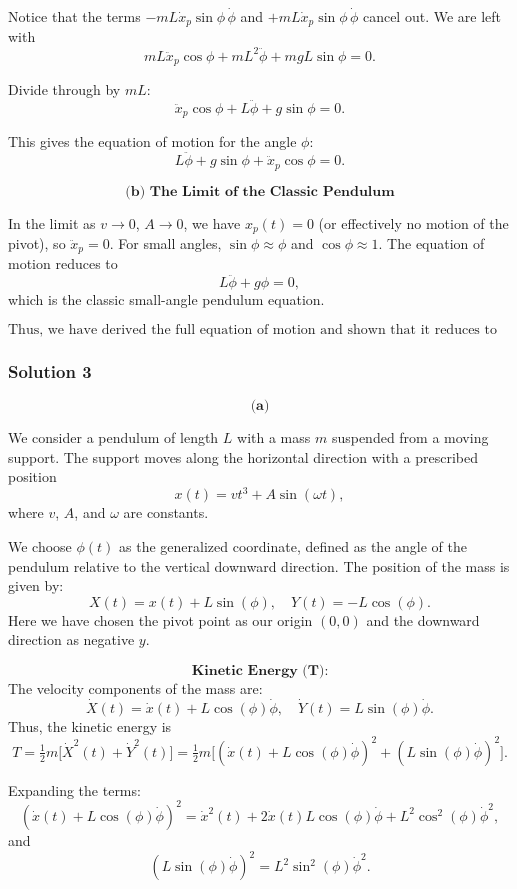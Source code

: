 \documentclass{article}
\begin{document}
Notice that the terms $-mL\dot{x}_p\sin\phi\,\dot{\phi}$ and $+mL\dot{x}_p\sin\phi\,\dot{\phi}$ cancel out. We are left with
\[
mL\ddot{x}_p\cos\phi + mL^2\ddot{\phi} + mgL\sin\phi = 0.
\]

Divide through by $mL$:
\[
\ddot{x}_p\cos\phi + L\ddot{\phi} + g\sin\phi = 0.
\]

This gives the equation of motion for the angle $\phi$:
\[
L\ddot{\phi} + g\sin\phi + \ddot{x}_p\cos\phi = 0.
\]

\[
\textbf{(b) The Limit of the Classic Pendulum}
\]

In the limit as $v \to 0$, $A \to 0$, we have $x_p(t)=0$ (or effectively no motion of the pivot), so $\ddot{x}_p = 0$. For small angles, $\sin\phi \approx \phi$ and $\cos\phi \approx 1$. The equation of motion reduces to
\[
L\ddot{\phi} + g\phi = 0,
\]
which is the classic small-angle pendulum equation.

\[
\boxed{ \text{Thus, we have derived the full equation of motion and shown that it reduces to the familiar simple pendulum equation under appropriate limits.} }
\]

\subsubsection{Solution 3}
\[
\textbf{(a)}
\]

We consider a pendulum of length \(L\) with a mass \(m\) suspended from a moving support. The support moves along the horizontal direction with a prescribed position
\[
x(t) = vt^3 + A\sin(\omega t),
\]
where \(v\), \(A\), and \(\omega\) are constants.

We choose \(\phi(t)\) as the generalized coordinate, defined as the angle of the pendulum relative to the vertical downward direction. The position of the mass is given by:
\[
X(t) = x(t) + L\sin(\phi), \quad Y(t) = -L\cos(\phi).
\]
Here we have chosen the pivot point as our origin \((0,0)\) and the downward direction as negative \(y\).

\[
\textbf{Kinetic Energy (T):}
\]
The velocity components of the mass are:
\[
\dot{X}(t) = \dot{x}(t) + L\cos(\phi)\dot{\phi}, \quad \dot{Y}(t) = L\sin(\phi)\dot{\phi}.
\]
Thus, the kinetic energy is
\[
T = \tfrac{1}{2}m\bigl[\dot{X}^2(t) + \dot{Y}^2(t)\bigr] 
= \tfrac{1}{2}m\bigl[(\dot{x}(t) + L\cos(\phi)\dot{\phi})^2 + (L\sin(\phi)\dot{\phi})^2\bigr].
\]

Expanding the terms:
\[
(\dot{x}(t) + L\cos(\phi)\dot{\phi})^2 = \dot{x}^2(t) + 2\dot{x}(t)L\cos(\phi)\dot{\phi} + L^2\cos^2(\phi)\dot{\phi}^2,
\]
and
\[
(L\sin(\phi)\dot{\phi})^2 = L^2\sin^2(\phi)\dot{\phi}^2.
\]
\end{document}
